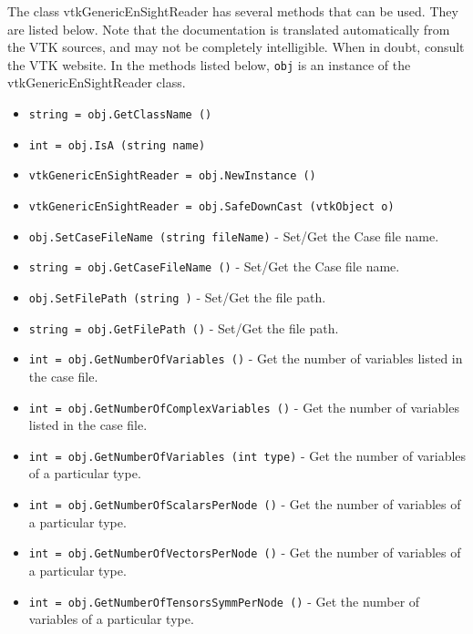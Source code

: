 The class vtkGenericEnSightReader has several methods that can be used.
  They are listed below.
Note that the documentation is translated automatically from the VTK sources,
and may not be completely intelligible.  When in doubt, consult the VTK website.
In the methods listed below, \verb|obj| is an instance of the vtkGenericEnSightReader class.
\begin{itemize}
\item  \verb|string = obj.GetClassName ()|

\item  \verb|int = obj.IsA (string name)|

\item  \verb|vtkGenericEnSightReader = obj.NewInstance ()|

\item  \verb|vtkGenericEnSightReader = obj.SafeDownCast (vtkObject o)|

\item  \verb|obj.SetCaseFileName (string fileName)| -  Set/Get the Case file name.

\item  \verb|string = obj.GetCaseFileName ()| -  Set/Get the Case file name.

\item  \verb|obj.SetFilePath (string )| -  Set/Get the file path.

\item  \verb|string = obj.GetFilePath ()| -  Set/Get the file path.

\item  \verb|int = obj.GetNumberOfVariables ()| -  Get the number of variables listed in the case file.

\item  \verb|int = obj.GetNumberOfComplexVariables ()| -  Get the number of variables listed in the case file.

\item  \verb|int = obj.GetNumberOfVariables (int type)| -  Get the number of variables of a particular type.

\item  \verb|int = obj.GetNumberOfScalarsPerNode ()| -  Get the number of variables of a particular type.

\item  \verb|int = obj.GetNumberOfVectorsPerNode ()| -  Get the number of variables of a particular type.

\item  \verb|int = obj.GetNumberOfTensorsSymmPerNode ()| -  Get the number of variables of a particular type.


\end{itemize}
